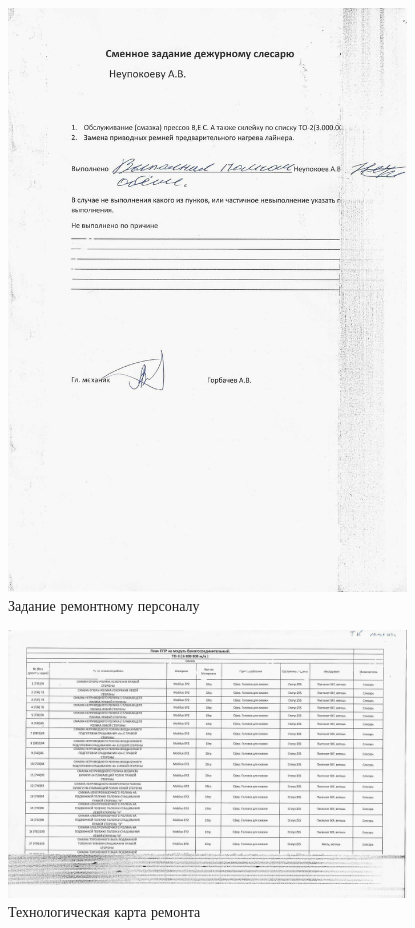 \begin{figure}
\begin{center}
  \includegraphics[height=0.94\textheight, width=0.94\textwidth, keepaspectratio]{Pics 1/8 задание дежурному_0001.jpg }
\end{center}
  \caption{Задание ремонтному персоналу}
  \label{pic:8 задание дежурному_0001}
\end{figure}



\begin{figure}
\begin{center}
  \includegraphics[height=0.94\textheight, width=0.94\textwidth, keepaspectratio]{Pics 1/8 ТК ремонта_0001.jpg }
\end{center}
  \caption{Технологическая карта ремонта}
  \label{pic:8 ТК ремонта_0001}
\end{figure}

